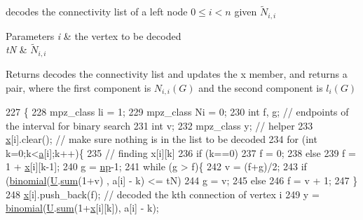 decodes the connectivity list of a left node $0 \leq i < n$ given $\tilde{N}_{i,i}$ 


\begin{DoxyParams}{Parameters}
{\em i} & the vertex to be decoded \\
\hline
{\em tN} & $\tilde{N}_{i,i}$ \\
\hline
\end{DoxyParams}
\begin{DoxyReturn}{Returns}
decodes the connectivity list and updates the x member, and returns a pair, where the first component is $N_{i,i}(G)$ and the second component is $l_{i}(G)$ 
\end{DoxyReturn}

\begin{DoxyCode}
227 \{
228   mpz\_class li = 1;
229   mpz\_class Ni = 0;
230   \textcolor{keywordtype}{int} f, g; \textcolor{comment}{// endpoints of the interval for binary search}
231   \textcolor{keywordtype}{int} v;
232   mpz\_class y; \textcolor{comment}{// helper}
233   \hyperlink{classb__graph__decoder_a6bba2e67984f9733fc60c40dd4956587}{x}[i].clear(); \textcolor{comment}{// make sure nothing is in the list to be decoded}
234   \textcolor{keywordflow}{for} (\textcolor{keywordtype}{int} k=0;k<\hyperlink{classb__graph__decoder_afcf783e4199fb8f9d6828db08bb12333}{a}[i];k++)\{
235     \textcolor{comment}{// finding x[i][k]}
236     \textcolor{keywordflow}{if} (k==0)
237       f = 0;
238     \textcolor{keywordflow}{else}
239       f = 1 + \hyperlink{classb__graph__decoder_a6bba2e67984f9733fc60c40dd4956587}{x}[i][k-1];
240     g = \hyperlink{classb__graph__decoder_a7eca48cf8793e722d1b29dbdc9fd2dca}{np}-1;
241     \textcolor{keywordflow}{while} (g > f)\{
242       v = (f+g)/2;
243       \textcolor{keywordflow}{if} (\hyperlink{compression__helper_8cpp_acecca9cb279d3b3d82915a07d67818cf}{binomial}(\hyperlink{classb__graph__decoder_ae15e74088bb60a096562a9bdaf380f2c}{U}.\hyperlink{classreverse__fenwick__tree_a672731fd6395b4853430073a099a80e6}{sum}(1+v) , a[i] - k) <= tN)
244         g = v;
245       \textcolor{keywordflow}{else}
246         f = v + 1;
247     \}
248     \hyperlink{classb__graph__decoder_a6bba2e67984f9733fc60c40dd4956587}{x}[i].push\_back(f); \textcolor{comment}{// decoded the kth connection of vertex i}
249     y = \hyperlink{compression__helper_8cpp_acecca9cb279d3b3d82915a07d67818cf}{binomial}(\hyperlink{classb__graph__decoder_ae15e74088bb60a096562a9bdaf380f2c}{U}.\hyperlink{classreverse__fenwick__tree_a672731fd6395b4853430073a099a80e6}{sum}(1+\hyperlink{classb__graph__decoder_a6bba2e67984f9733fc60c40dd4956587}{x}[i][k]), a[i] - k);

\end{DoxyCode}
